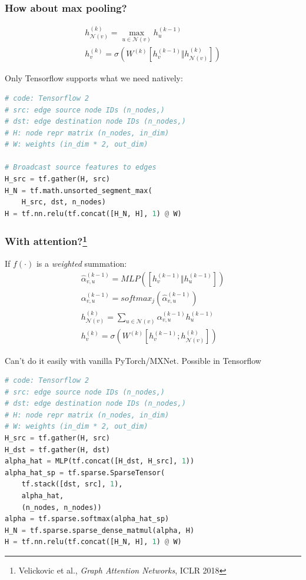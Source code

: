\documentclass[10pt,aspectratio=169]{beamer}
\begin{document}
	\begin{frame}[fragile]
		\frametitle{How about max pooling?}
		
		\begin{minipage}{0.4\textwidth}
			$$
			\begin{gathered}
			h_{\mathcal{N}(v)}^{(k)} =
			\max_{u \in \mathcal{N}(v)} h^{(k-1)}_u \\
			h^{(k)}_v =
			\sigma \left( W^{(k)} \left[h_v^{(k-1)} \Vert h_{\mathcal{N}(v)}^{(k)}\right] \right)
			\end{gathered}
			$$
		\end{minipage}\hfill%
		\begin{minipage}{0.5\textwidth}
			Only Tensorflow supports what we need natively:
\begin{lstlisting}[language=Python]
# code: Tensorflow 2
# src: edge source node IDs (n_nodes,)
# dst: edge destination node IDs (n_nodes,)
# H: node repr matrix (n_nodes, in_dim)
# W: weights (in_dim * 2, out_dim)

# Broadcast source features to edges
H_src = tf.gather(H, src)
H_N = tf.math.unsorted_segment_max(
    H_src, dst, n_nodes)
H = tf.nn.relu(tf.concat([H_N, H], 1) @ W)
\end{lstlisting}
		\end{minipage}
	\end{frame}

	\begin{frame}[fragile]
		\frametitle{With attention?\footnote{Velickovic et al., \emph{Graph Attention Networks}, ICLR 2018}}
		\begin{minipage}{0.4\textwidth}
			If $f(\cdot)$ is a \emph{weighted} summation:
			$$
			\begin{gathered}
			\hat\alpha ^{(k-1)}_{v,u} = MLP\left(\left[h_v^{(k-1)} \Vert h_u^{(k-1)}\right]\right) \\
			\alpha^{(k-1)}_{v,u} = softmax_j\left(
			\hat\alpha ^{(k-1)}_{v,u}
			\right)\\
			h_{\mathcal{N}(v)}^{(k)} =
			\sum_{u \in \mathcal{N}(v)} \alpha^{(k-1)}_{v,u} h^{(k-1)}_u \\
			h^{(k)}_v =
			\sigma \left( W^{(k)} \left[h_v^{(k-1)}; h_{\mathcal{N}(v)}^{(k)}\right] \right)
			\end{gathered}
			$$
		\end{minipage}\hfill%
		\begin{minipage}{0.5\textwidth}
			Can't do it easily with vanilla PyTorch/MXNet.  Possible in Tensorflow
\begin{lstlisting}[language=Python]
# code: Tensorflow 2
# src: edge source node IDs (n_nodes,)
# dst: edge destination node IDs (n_nodes,)
# H: node repr matrix (n_nodes, in_dim)
# W: weights (in_dim * 2, out_dim)
H_src = tf.gather(H, src)
H_dst = tf.gather(H, dst)
alpha_hat = MLP(tf.concat([H_dst, H_src], 1))
alpha_hat_sp = tf.sparse.SparseTensor(
    tf.stack([dst, src], 1),
    alpha_hat,
    (n_nodes, n_nodes))
alpha = tf.sparse.softmax(alpha_hat_sp)
H_N = tf.sparse.sparse_dense_matmul(alpha, H)
H = tf.nn.relu(tf.concat([H_N, H], 1) @ W)
\end{lstlisting}
		\end{minipage}
	\end{frame}
\end{document}

